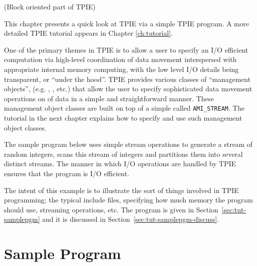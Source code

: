 \tobewritten(Block oriented part of TPIE)

This chapter presents a quick look at TPIE via a simple TPIE program.
A more detailed TPIE tutorial appears in Chapter \ref{ch:tutorial}.

One of the primary themes in TPIE is to allow a user to specify an I/O
efficient computation via high-level coordination of data movement
interspersed with appropriate internal memory computing, with the low
level I/O details being transparent, or ``under the hood''.  TPIE
provides various classes of ``management objects'', (e.g. , , etc.) that
allow the user to specify sophisticated data movement operations on
 of data in a simple and straightforward manner. These
management object classes are built on top of a simple  called \lstinline|AMI_STREAM|. The tutorial in the next
chapter explains how to specify and use such management object
classes.

The sample program below uses simple stream
operations %
to generate a stream of random integers, scans this stream
of integers and partitions them into several distinct
streams. The manner in which I/O operations are handled by
TPIE ensures that the program is I/O efficient.


The intent of this example is to illustrate the sort of things
involved in TPIE programming; the typical include files, specifying
how much memory the program should use, streaming operations, etc. The
program is given in Section~\ref{sec:tut-samplepgm} and it is
discussed in Section~\ref{sec:tut-samplepgm-discuss}.


\section{Sample Program}

